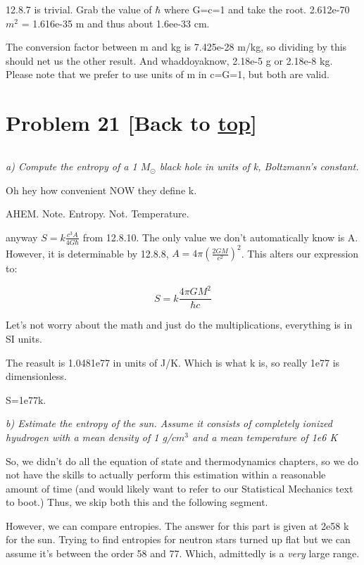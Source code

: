 \documentclass[landscape,letterpaper,10pt,english]{article}
\begin{document}
    12.8.7 is trivial. Grab the value of \(\hbar\) where G=c=1 and take the
root. 2.612e-70 \(m^2\) = 1.616e-35 m and thus about 1.6ee-33 cm.

The conversion factor between m and kg is 7.425e-28 m/kg, so dividing by
this should net us the other result. And whaddoyaknow, 2.18e-5 g or
2.18e-8 kg. Please note that we prefer to use units of m in c=G=1, but
both are valid.

    \hypertarget{problem-21-back-to-top}{%
\section{\texorpdfstring{Problem 21 {[}Back to
\hyperref[toc]{top}{]}}{Problem 21 {[}Back to {]}}}\label{problem-21-back-to-top}}

\[\label{P21}\]

\emph{a) Compute the entropy of a 1 \(M_\odot\) black hole in units of
k, Boltzmann's constant.}

Oh hey how convenient NOW they define k.

AHEM. Note. Entropy. Not. Temperature.

anyway \(S = k\frac{c^3A}{4G\hbar}\) from 12.8.10. The only value we
don't automatically know is A. However, it is determinable by 12.8.8,
\(A = 4\pi(\frac{2GM}{c^2})^2\). This alters our expression to:

\[ S = k\frac{4 \pi G M^2}{\hbar c} \]

    Let's not worry about the math and just do the multiplications,
everything is in SI units.

The reasult is 1.0481e77 in units of J/K. Which is what k is, so really
1e77 is dimensionless.

S=1e77k.

    \emph{b) Estimate the entropy of the sun. Assume it consists of
completely ionized hyudrogen with a mean density of 1 g/\(cm^3\) and a
mean temperature of 1e6 K}

    So, we didn't do all the equation of state and thermodynamics chapters,
so we do not have the skills to actually perform this estimation within
a reasonable amount of time (and would likely want to refer to our
Statistical Mechanics text to boot.) Thus, we skip both this and the
following segment.

However, we can compare entropies. The answer for this part is given at
2e58 k for the sun. Trying to find entropies for neutron stars turned up
flat but we can assume it's between the order 58 and 77. Which,
admittedly is a \emph{very} large range.
\end{document}
